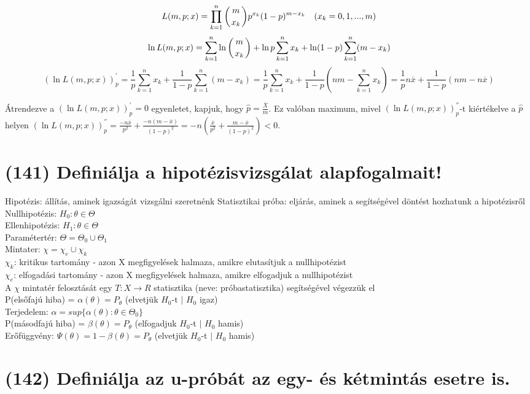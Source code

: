 \documentclass[12p]{article}
\begin{document}
$$L(m, p; x) = \prod_{k=1}^n \displaystyle{\left({m \atop x_k}\right)}p^{x_k}(1-p)^{m-x_k} \quad (x_k = 0, 1, ..., m)$$
$$\ln L(m, p; x) = \sum^n_{k=1} \ln \left ({m \atop x_k}\right) + \ln p \sum^n_{k=1} x_k + \ln(1-p) \sum^n_{k=1}(m-x_k)$$
$$(\ln L(m,p;x))^{'}_p = \frac{1}{p} \sum^n_{k=1}x_k + \frac{1}{1-p} \sum^n_{k=1} (m - x_k) = \frac{1}{p} \sum^n_{k=1}x_k + \frac{1}{1-p}
\left(nm- \sum^n_{k=1}x_k \right) = \frac{1}{p}n\overline{x} + \frac{1}{1-p}(nm-n\overline{x})$$

Átrendezve a $(\ln L(m,p;x))^{'}_p = 0$ egyenletet, kapjuk, hogy $\hat{p} = \frac{\overline{X}}{m}$.  Ez valóban maximum, mivel $(\ln L(m,p;x))^{''}_p$-t kiértékelve a $\hat{p}$ helyen $(\ln L(m,p;x))^{''}_p = \frac{-n \overline{x}}{p^2} + \frac{-n(m-\overline{x})}{(1-p)^2}=
-n\left(\frac{\overline{x}}{p^2}+\frac{m - \overline{x}}{(1-p)^2}\right)<0$.

\section{(141) Definiálja a hipotézisvizsgálat alapfogalmait!}

Hipotézis: állítás, aminek igazságát vizsgálni szeretnénk
Statisztikai próba: eljárás, aminek a segítségével döntést hozhatunk a hipotézisről
Nullhipotézis: $H_0 : \theta \in \Theta$\\
Ellenhipotézis: $H_1 : \theta \in \Theta$\\
Paramétertér: $\Theta = \Theta_0 \cup \Theta_1$\\
Mintater: $\chi = \chi_e \cup \chi_k$\\
$\chi_k$: kritikus tartomány - azon X megfigyelések halmaza, amikre elutasítjuk a nullhipotézist\\
$\chi_e$: elfogadási tartomány - azon X megfigyelések halmaza, amikre elfogadjuk a nullhipotézist\\
A $\chi$ mintatér felosztását egy $T : X \rightarrow R$ statisztika (neve: próbastatisztika) segítségével végezzük el\\
P(elsőfajú hiba) = $\alpha(\theta) = P_\theta$ (elvetjük $H_0$-t $|$ $H_0$ igaz)\\
Terjedelem: $\alpha = sup\{\alpha(\theta) : \theta \in \Theta_0\}$\\
P(másodfajú hiba) = $\beta(\theta) = P_\theta$ (elfogadjuk $H_0$-t $|$ $H_0$ hamis)\\
Erőfüggvény: $\Psi(\theta) = 1 - \beta(\theta) = P_\theta$ (elvetjük $H_0$-t $|$ $H_0$ hamis)

\section{(142)  Definiálja az u-próbát az egy- és kétmintás esetre is.}
\end{document}
